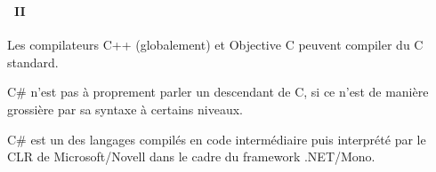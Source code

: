 \begin{frame}
  \frametitle{\secname}
  \framesubtitle{\subsecname~II}
  
  \par
  Les compilateurs C++ (globalement) et Objective C peuvent compiler du C standard.
  \vspace{0.5cm}
  \par\hrulefill\par
  \vspace{0.5cm}
  \par
  C\# n'est pas à proprement parler un descendant de C, si ce n'est de manière
  grossière par sa syntaxe à certains niveaux. 
  \par
  C\# est un des langages compilés en code intermédiaire puis interprété par le CLR de Microsoft/Novell dans le cadre du
  framework .NET/Mono.
\end{frame}

